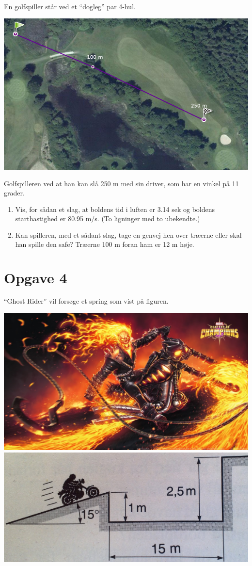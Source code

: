 \documentclass[a4paper, 12pt]{article}
\begin{document}
En golfspiller står ved et “dogleg” par 4-hul.

\begin{center}
\includegraphics[width=0.7\linewidth]{img/golf.png}
\end{center}

Golfspilleren ved at han kan slå 250 m med sin driver, som har en vinkel på 11 grader.

\begin{enumerate}
\item Vis, for sådan et slag, at boldens tid i luften er 3.14 sek og boldens starthastighed er 80.95 m/s. (To ligninger med to ubekendte.)
\item Kan spilleren, med et sådant slag, tage en genvej hen over træerne eller skal han spille den safe? Træerne 100 m foran ham er 12 m høje.
\end{enumerate}


\section*{Opgave 4}
\label{sec:org416a248}

“Ghost Rider” vil forsøge et spring som vist på figuren.
\begin{center}
\includegraphics[height=0.23\textwidth]{img/2019-10-30_10-35-14_maxresdefault.jpg}
\includegraphics[height=0.23\textwidth]{img/ghost_rider.png}
\end{center}
\end{document}
